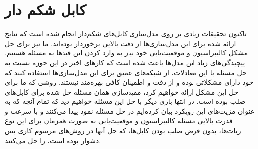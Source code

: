 \chapter{کابل شکم دار}

تاکنون تحقیقات زیادی بر روی مدل‌سازی کابل‌های شکم‌دار انجام شده است که نتایج ارائه شده برای این مدل‌سازی‌ها از دقت بالایی برخوردار بوده‌اند. ما نیز برای حل مشکل کالیبراسیون و موقعیت‌یابی خود نیاز به وارد کردن این قیدها به مسئله هستیم. پیچیدگی‌های زیاد این مدل‌ها باعث شده است که کارهای اخیر در این حوزه نسبت به حل مسئله با این معادلات، از شبکه‌های عمیق برای این مدل‌سازی‌ها استفاده کنند که خود دارای مشکلاتی بوده و از دقت و اطمینان کافی بهره‌مند نیستند. روشی که ما برای حل این مشکل ارائه خواهیم کرد، مقیدسازی همان مسئله حل شده برای کابل‌های صلب بوده است. در انتها باری دیگر با حل این مسئله خواهیم دید که تمام آنچه که به عنوان مزیت‌های این رویکرد بیان کرده‌ایم در حل مسئله نمود پیدا می‌کنند و با سرعت و قدرت بالایی مسئله کالیبراسیون و موقعیت‌یابی به صورت همزمان برای این نوع ربات‌ها، بدون فرض صلب بودن کابل‌ها، که حل آنها در روش‌های مرسوم کاری بس دشوار بوده است، را حل می‌کنند.
